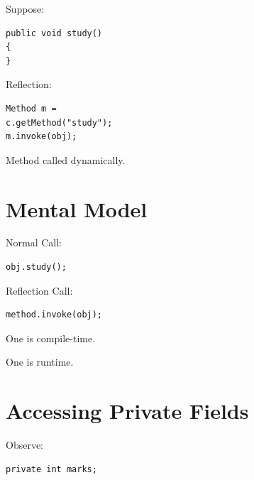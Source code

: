 \documentclass[11pt,a4paper]{book}
\begin{document}
Suppose:

\begin{verbatim} 
public void study()
{
}
\end{verbatim}


Reflection:

\begin{verbatim} 
Method m =
c.getMethod("study");
m.invoke(obj);
\end{verbatim}


Method called dynamically.


\section{Mental Model}

Normal Call:

\begin{verbatim} 
obj.study();
\end{verbatim}


Reflection Call:

\begin{verbatim} 
method.invoke(obj);
\end{verbatim}


One is compile-time.


One is runtime.


\section{Accessing Private Fields}

Observe:

\begin{verbatim} 
private int marks;
\end{verbatim}
\end{document}
